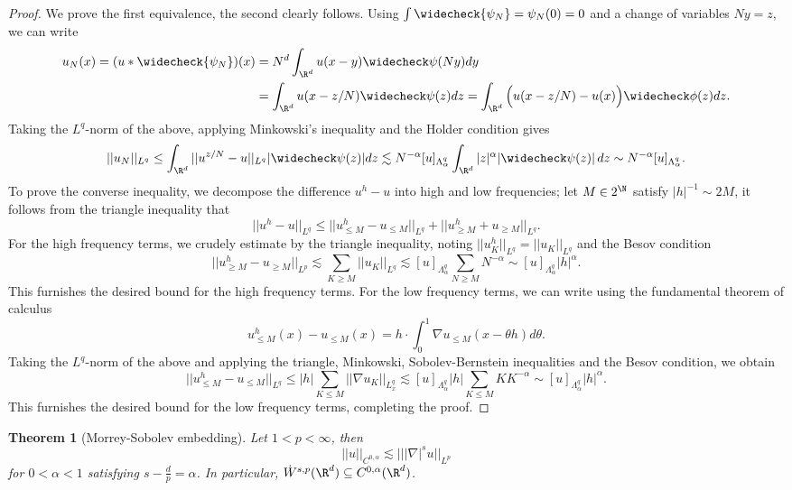 \documentclass[reqno]{amsart}
\newtheorem{theorem}{Theorem}
\theoremstyle{definition}
\theoremstyle{remark}
\begin{document}
\begin{proof}
	We prove the first equivalence, the second clearly follows. Using $\int \widecheck{\psi_N} = \psi_N (0) = 0$ and a change of variables $Ny = z$, we can write
		\begin{align*}
			u_N (x) = (u * \widecheck{\psi_N})(x) 
				&= N^d \int_{\R^d} u(x - y) \widecheck\psi (Ny) dy \\
				&= \int_{\R^d} u(x - z/N) \widecheck \psi (z) dz = \int_{\R^d} \Big( u(x - z/N) - u(x)\Big) \widecheck \phi (z) dz.
		\end{align*}	
	Taking the $L^q$-norm of the above, applying Minkowski's inequality and the Holder condition gives
		\begin{align*}
			||u_N||_{L^q} \leq  \int_{\R^d} ||u^{z/N} - u||_{L^q} |\widecheck \psi (z)| dz \lesssim N^{-\alpha} [u]_{\Lambda^q_\alpha} \int_{\R^d} |z|^\alpha |\widecheck \psi (z)| \, dz \sim N^{-\alpha} [u]_{\Lambda^q_\alpha}. 
		\end{align*}
	To prove the converse inequality, we decompose the difference $u^h - u$ into high and low frequencies; let $M \in 2^\N$ satisfy $ |h|^{-1} \sim 2M$, it follows from the triangle inequality that
		\[ || u^h - u||_{L^q} \leq ||u^h_{\leq M} - u_{\leq M} ||_{L^q} + ||u^h_{\geq M} + u_{\geq M} ||_{L^q}.  \]
	For the high frequency terms, we crudely estimate by the triangle inequality, noting $||u^h_{K}||_{L^q} = ||u_{K} ||_{L^q}$ and the Besov condition
		\[ || u^h_{\geq M} - u_{\geq M} ||_{L^p} \lesssim \sum_{K\geq M} ||u_K||_{L^q} \lesssim [u]_{\Lambda^q_\alpha} \sum_{N \geq M} N^{-\alpha} \sim [u]_{\Lambda^q_\alpha} |h|^{\alpha}.\]	
	This furnishes the desired bound for the high frequency terms. For the low frequency terms, we can write using the fundamental theorem of calculus
		\[  u^h_{\leq M} (x) -  u_{\leq M} (x)  = h \cdot \int_0^1 \nabla u_{\leq M} (x - \theta h) d \theta. \]	
	Taking the $L^q$-norm of the above and applying the triangle, Minkowski, Sobolev-Bernstein inequalities and the Besov condition, we obtain
		\[ ||u^h_{\leq M} - u_{\leq M} ||_{L^q} \leq |h| \sum_{K \leq M} ||\nabla u_{K}||_{L^q_x} \lesssim  [u]_{\Lambda^q_\alpha} |h| \sum_{K \leq M} K K^{-\alpha} \sim [u]_{\Lambda^q_\alpha} |h|^\alpha  . \]	
	This furnishes the desired bound for the low frequency terms, completing the proof. 		
\end{proof}

\begin{theorem}[Morrey-Sobolev embedding]
	Let $1 < p < \infty$, then 
		\[ || u ||_{C^{0, \alpha}} \lesssim |||\nabla|^s u||_{L^p}  \]
	for $0 < \alpha < 1$ satisfying $s - \tfrac{d}{p} = \alpha$. In particular, $\dot W^{s, p} (\R^d) \subseteq C^{0, \alpha} (\R^d)$.
\end{theorem}
\end{document}
